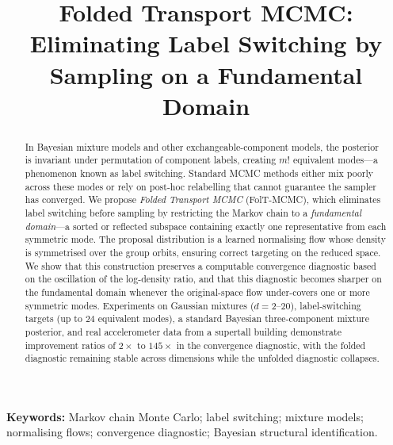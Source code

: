 \documentclass[a4paper,12pt]{article}
\title{Folded Transport MCMC: Eliminating Label Switching
  by Sampling on a Fundamental Domain}
\author{}
\date{}
\theoremstyle{definition}
\theoremstyle{remark}
\begin{document}
\maketitle

\begin{abstract}
In Bayesian mixture models and other exchangeable-component
models, the posterior is invariant under permutation of
component labels, creating $m!$ equivalent modes---a
phenomenon known as label switching.  Standard MCMC methods
either mix poorly across these modes or rely on post-hoc
relabelling that cannot guarantee the sampler has converged.
We propose \emph{Folded Transport MCMC} (FolT-MCMC), which
eliminates label switching before sampling by restricting the
Markov chain to a \emph{fundamental domain}---a sorted or
reflected subspace containing exactly one representative from
each symmetric mode.  The proposal distribution is a learned
normalising flow whose density is symmetrised over the group
orbits, ensuring correct targeting on the reduced space.
We show that this construction preserves a computable
convergence diagnostic based on the oscillation of the
log-density ratio, and that this diagnostic becomes sharper on the fundamental
domain whenever the original-space flow under-covers one or
more symmetric modes.
Experiments on Gaussian mixtures ($d = 2$--$20$),
label-switching targets (up to $24$ equivalent modes), a
standard Bayesian three-component mixture posterior, and real
accelerometer data from a supertall building demonstrate
improvement ratios of $2\times$ to $145\times$ in the
convergence diagnostic, with the folded diagnostic remaining
stable across dimensions while the unfolded diagnostic
collapses.
\end{abstract}

\noindent
\textbf{Keywords:}
Markov chain Monte Carlo; label switching; mixture models;
normalising flows; convergence diagnostic;
Bayesian structural identification.

\bigskip










\end{document}
